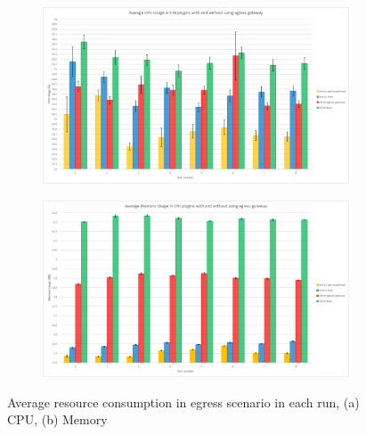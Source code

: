 \begin{figure}[H]
    \centering
    \begin{subfigure}[b]{0.55\textwidth}
        \includegraphics[width=\textwidth]{plots/egress/cpu_all.png}
        \caption{}
        \label{fig:cpu_all}
    \end{subfigure}
    \begin{subfigure}[b]{0.55\textwidth}
        \includegraphics[width=\textwidth]{plots/egress/memory_all.png}
        \caption{}
        \label{fig:memory_all}
    \end{subfigure}
    
    \caption{Average resource consumption in egress scenario in each run, (a) CPU, (b) Memory}
    \label{fig:res_all}
\end{figure}



